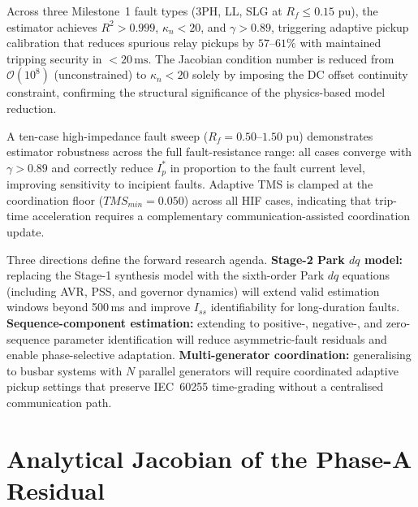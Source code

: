 \documentclass[journal, twoside, 10pt]{IEEEtran}
\newcommand{\pu}{\,\text{pu}}
\begin{document}
Across three Milestone~1 fault types (3PH, LL, SLG at $R_f \leq 0.15\,\pu$),
the estimator achieves $R^2 > 0.999$, $\kappa_n < 20$, and $\gamma > 0.89$,
triggering adaptive pickup calibration that reduces spurious relay pickups by
$57$--$61\%$ with maintained tripping security in $< 20\,\text{ms}$.  The
Jacobian condition number is reduced from $\mathcal{O}(10^8)$ (unconstrained)
to $\kappa_n < 20$ solely by imposing the DC offset continuity constraint,
confirming the structural significance of the physics-based model reduction.

A ten-case high-impedance fault sweep ($R_f = 0.50$--$1.50\,\pu$) demonstrates
estimator robustness across the full fault-resistance range: all cases
converge with $\gamma > 0.89$ and correctly reduce $I_p^*$ in proportion to
the fault current level, improving sensitivity to incipient faults.  Adaptive
TMS is clamped at the coordination floor ($TMS_{min} = 0.050$) across all HIF
cases, indicating that trip-time acceleration requires a complementary
communication-assisted coordination update.

Three directions define the forward research agenda.
\textbf{Stage-2 Park $dq$ model:} replacing the Stage-1 synthesis model with
the sixth-order Park $dq$ equations (including AVR, PSS, and governor
dynamics) will extend valid estimation windows beyond 500\,ms and improve
$I_{ss}$ identifiability for long-duration faults.
\textbf{Sequence-component estimation:} extending to positive-, negative-, and
zero-sequence parameter identification will reduce asymmetric-fault residuals
and enable phase-selective adaptation.
\textbf{Multi-generator coordination:} generalising to busbar systems with
$N$ parallel generators will require coordinated adaptive pickup settings that
preserve IEC~60255 time-grading without a centralised communication path.

\appendices

\section{Analytical Jacobian of the Phase-A Residual}
\label{app:jacobian}
\end{document}
